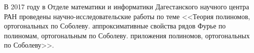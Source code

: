\Conclusion

В 2017 году в Отделе математики и информатики Дагестанского научного центра РАН проведены научно-исследовательские работы по теме
<<Теория полиномов, ортогональных по Соболеву. аппроксимативные свойства рядов Фурье по полиномам, ортогональным по Соболеву. приложения полиномов, ортогональных по Соболеву>>.



